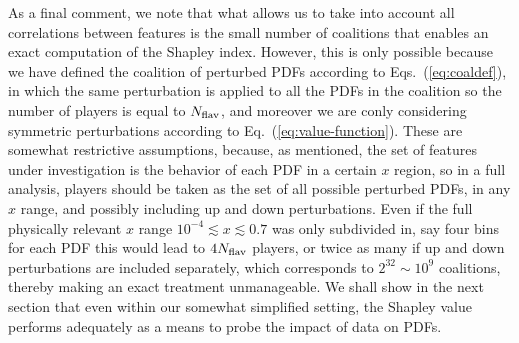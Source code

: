 \documentclass[11pt,a4paper]{article}
\begin{document}
As a final comment, we note that what allows us to take into account all correlations between features is the small number of coalitions that enables an exact computation of the Shapley index. However, this is only possible because we have defined the coalition of perturbed PDFs according to Eqs.~(\ref{eq:coaldef}), in which the same perturbation is applied to all the PDFs in the coalition so the number of players is equal to $N_{\rm flav}$, and moreover we are conly considering symmetric perturbations according to Eq.~(\ref{eq:value-function}). These are somewhat restrictive assumptions, because, as mentioned, the set of features under investigation is the behavior of each PDF in a certain $x$ region, so in a full analysis, players should be taken as the set of all possible perturbed PDFs, in any $x$ range, and possibly including up and down perturbations. Even if the full physically relevant $x$ range $10^{-4}\lesssim x\lesssim0.7$
was only subdivided in, say four bins for each PDF this would lead to $4 N_{\rm flav}$ players, or twice as many if up and down perturbations are included separately, which corresponds to $2^{32}\sim 10^9$ coalitions, thereby making an exact treatment unmanageable. We shall show in the next section that even within our somewhat simplified setting, the Shapley value performs adequately as a means to probe the impact of data on PDFs.





%
%







%
\end{document}
